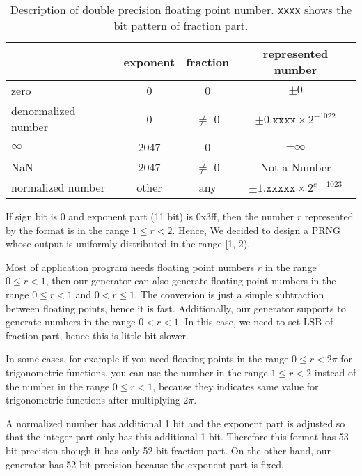 \documentclass{svmult}
\begin{document}
\begin{table}[h]
  \begin{center}
    \begin{tabular}{|l|c|c|c|} \hline
      & exponent & fraction & represented number \\ \hline
      zero & 0 & 0 & $\pm 0$ \\ \hline
      denormalized number & 0 & $\neq$ 0 
      & $\pm 0.\texttt{xxxx} \times 2^{-1022}$ \\ 
      \hline
      $\infty$ & 2047 & 0 & $\pm\infty$ \\ \hline
      NaN & 2047 & $\neq$ 0 & Not a Number \\ \hline
      normalized number & 
      other & any & 
      $\pm 1.\texttt{xxxxx} \times 2^{e - 1023}$ \\ \hline
    \end{tabular}
    \caption{Description of double precision floating point
      number. \texttt{xxxx} shows the bit pattern of fraction part.}
    \label{tab:ieee}
  \end{center}
\end{table}

If sign bit is 0 and exponent part (11 bit) is 0x3ff,
then the number $r$ represented by the format is in the range $1 \le r
< 2$. Hence, We decided to design a PRNG whose output is uniformly
distributed in the range [1, 2).

Most of application program needs floating point numbers $r$ in the
range $0 \le r < 1$, then our generator can also generate floating
point numbers in the range $0 \le r < 1$ and $0 < r \le 1$. The
conversion is just a simple subtraction between floating points, hence
it is fast.  Additionally, our generator supports to generate numbers
in the range $0 < r < 1$.  In this case, we need to set LSB of
fraction part, hence this is little bit slower.

In some cases, for example if you need floating points in the range $0
\le r < 2\pi$ for trigonometric functions, you can use the number in
the range $1 \le r < 2$ instead of the number in the range $0 \le r <
1$, because they indicates same value for trigonometric functions
after multiplying $2\pi$.

\begin{note}
  A normalized number has additional 1 bit and the exponent part is
  adjusted so that the integer part only has this additional 1 bit.
  Therefore this format has 53-bit precision though it has only 52-bit
  fraction part. On the other hand, our generator has 52-bit precision
  because the exponent part is fixed.
\end{note}
\end{document}

